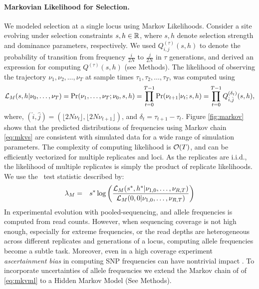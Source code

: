 \documentclass[11pt]{article}
\def\comale{\text{COMALE }}
\begin{document}
\paragraph{Markovian Likelihood for Selection.}
We modeled selection at a single locus using Markov
Likelihoods. Consider a site evolving under selection constraints
$s,h\in {\mathbb R}$, where $s,h$ denote selection strength and dominance
parameters, respectively. We used $Q^{(\tau)}_{i,j}(s,h)$ to denote
the probability of transition from frequency $\frac{i}{2N}$ to
$\frac{j}{2N}$ in $\tau$ generations, and derived an expression for
computing $Q^{(\tau)}(s,h)$ (see Methods). The likelihood of observing
the trajectory $\nu_1,\nu_2,\ldots,\nu_{T}$ at sample times
$\tau_1,\tau_2,\ldots,\tau_T$, was computed using
\begin{equation}
  {\cal L}_{M}(s,h|\nu_0,\ldots,\nu_T)=\operatorname{Pr}(\nu_1,\ldots,\nu_T;\nu_0,s,h)=
  \prod_{t=0}^{T-1} \operatorname{Pr}(\nu_{t+1}|\nu_t;s,h) = \prod_{t=0}^{T-1} Q^{(\delta_t)}_{\hat{i},\hat{j}}(s,h),
  \label{eq:mkvlik}  
\end{equation}
where, $(\hat{i},\hat{j})=(\lfloor 2N\nu_t\rfloor, \lfloor
2N\nu_{t+1}\rfloor)$, and $\delta_t=\tau_{t+1}-\tau_t$. Figure
\ref{fig:markov} shows that the predicted distributions of
frequencies using Markov chain \ref{eq:mkvs} are consistent with
simulated data for a wide range of simulation parameters. The
complexity of computing likelihood is ${\cal O}(T)$, and can be efficiently
vectorized for multiple replicates and loci. As the replicates are
i.i.d., the likelihood of multiple replicates is simply the product of
replicate likelihoods. We use the \comale\ test statistic described
by:
\begin{eqnarray}
\lambda_M &=& s^*\log 
\left(\frac{{\cal L}_M(s^*,h^*|\nu_{1,0},\ldots,\nu_{R,T})}{{\cal L}_M(0,0|\nu_{1,0},\ldots,\nu_{R,T})}\right)
\label{eq:mkvml}
\end{eqnarray}
In experimental evolution with pooled-sequencing, and allele frequencies is computed from read counts. However, when sequencing coverage is not high enough, especially for extreme frequencies, or the read depths are heterogeneous across different replicates and generations of a locus, computing allele frequencies become a subtle task. Moreover, even in a high coverage experiment \emph{ascertainment bias} in computing SNP frequencies can have nontrivial impact \cite{}.
To incorporate uncertainties of allele frequencies we extend the Markov chain of of \eqref{eq:mkvml} to a Hidden Markov
Model (See Methods).  
\end{document}
